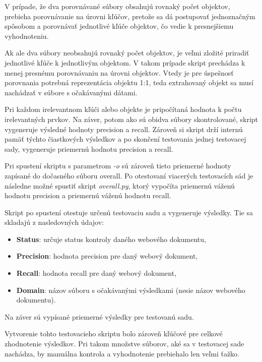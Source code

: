 V prípade, že dva porovnávané súbory obsahujú rovnaký počet objektov, prebieha porovnávanie na úrovni kľúčov, pretože sa dá postupovať jednoznačným spôsobom a porovnávať jednotlivé kľúče objektov, čo vedie k presnejšiemu vyhodnoteniu. 

Ak ale dva súbory neobsahujú rovnaký počet objektov, je veľmi zložité priradiť jednotlivé kľúče k jednotlivým objektom. V takom prípade skript prechádza k menej presnému porovnávaniu na úrovni objektov. Vtedy je pre úspešnosť porovnania potrebná reprezentácia objektu 1:1, teda extrahovaný objekt sa musí nachádzať v súbore s očakávanými dátami.

Pri každom irelevantnom kľúči alebo objekte je pripočítaná hodnota k počtu irelevantných prvkov. Na záver, potom ako sú obidva súbory skontrolované, skript vygeneruje výsledné hodnoty precision a recall. Zároveň si skript drží internú pamäť týchto čiastkových výsledkov a po skončení testovania jednej testovacej sady, vygeneruje priemernú hodnotu precision a recall.

Pri spustení skriptu s parametrom \textit{-o} sú zároveň tieto priemerné hodnoty zapísané do dočasného súboru overall. Po otestovaní viacerých testovacích sád je následne možné spustiť skript \textit{overall.py}, ktorý vypočíta priemernú váženú hodnotu precision a priemernú váženú hodnotu recall.

\bigskip

Skript po spustení otestuje určenú testovaciu sadu a vygeneruje výsledky. Tie sa skladajú z nasledovných údajov:

\begin{itemize}
    \item \textbf{Status}: určuje status kontroly daného webového dokumentu,
    \item \textbf{Precision}: hodnota precision pre daný webový dokument,
    \item \textbf{Recall}: hodnota recall pre daný webový dokument,
    \item \textbf{Domain}: názov súboru s očakávanými výsledkami (nesie názov webového dokumentu).
\end{itemize}

\bigskip

Na záver sú vypísané priemerné výsledky pre testovanú sadu.

\bigskip

Vytvorenie tohto testovacieho skriptu bolo zároveň kľúčové pre celkové zhodnotenie výsledkov. Pri takom množstve súborov, aké sa v testovacej sade nachádza, by manuálna kontrola a vyhodnotenie prebiehalo len veľmi ťažko.


